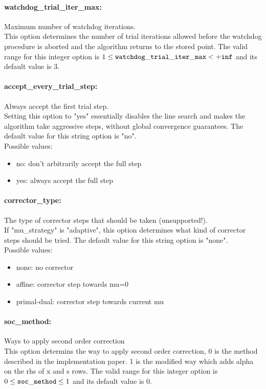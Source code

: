 \paragraph{watchdog\_trial\_iter\_max:}\label{opt:watchdog_trial_iter_max} Maximum number of watchdog iterations. \\
 This option determines the number of trial iterations allowed before the watchdog procedure is aborted and the algorithm returns to the stored point. The valid range for this integer option is
$1 \le {\tt watchdog\_trial\_iter\_max } <  {\tt +inf}$
and its default value is $3$.


\paragraph{accept\_every\_trial\_step:}\label{opt:accept_every_trial_step} Always accept the first trial step. \\
 Setting this option to "yes" essentially disables the line search and makes the algorithm take aggressive steps, without global convergence guarantees. The default value for this string option is "no".
\\ 
Possible values:
\begin{itemize}
   \item no: don't arbitrarily accept the full step
   \item yes: always accept the full step
\end{itemize}

\paragraph{corrector\_type:}\label{opt:corrector_type} The type of corrector steps that should be taken (unsupported!). \\
 If "mu\_strategy" is "adaptive", this option determines what kind of corrector steps should be tried. The default value for this string option is "none".
\\ 
Possible values:
\begin{itemize}
   \item none: no corrector
   \item affine: corrector step towards mu=0
   \item primal-dual: corrector step towards current mu
\end{itemize}

\paragraph{soc\_method:}\label{opt:soc_method} Ways to apply second order correction \\
 This option determins the way to apply second order correction, 0 is the method described in the implementation paper. 1 is the modified way which adds alpha on the rhs of x and s rows. The valid range for this integer option is
$0 \le {\tt soc\_method } \le 1$
and its default value is $0$.


